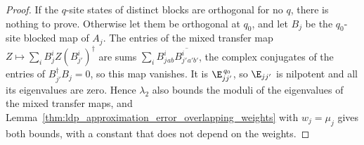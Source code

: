 \begin{proof}
    \leanok
    If the $q$-site states of distinct blocks are orthogonal for no $q$, there is
    nothing to prove. Otherwise let them be orthogonal at $q_0$, and let $B_j$ be
    the $q_0$-site blocked map of $A_j$. The entries of the mixed transfer map
    $Z\mapsto\sum_iB_j^iZ(B_{j'}^i)^\dagger$ are sums
    $\sum_iB_j^{i}{}_{ab}\overline{B_{j'}^{i}{}_{a'b'}}$, the complex conjugates of
    the entries of $B_{j'}^\dagger B_j=0$, so this map vanishes. It is
    $\E_{jj'}^{\,q_0}$, so $\E_{jj'}$ is nilpotent and all its eigenvalues are
    zero. Hence $\lambda_2$ also bounds the moduli of the eigenvalues of the mixed
    transfer maps, and Lemma~\ref{thm:ldp_approximation_error_overlapping_weights}
    with $w_j=\mu_j$ gives both bounds, with a constant that does not depend on the
    weights.
\end{proof}



















